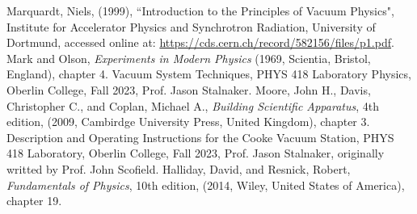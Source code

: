 \documentclass[11pt,letterpaper]{article}
\begin{document}
\begin{thebibliography}{99}
 Marquardt, Niels, (1999), ``Introduction to the Principles of Vacuum Physics", Institute for Accelerator Physics and Synchrotron Radiation, University of Dortmund, accessed online at: \url{https://cds.cern.ch/record/582156/files/p1.pdf}.
 Mark and Olson, \textit{Experiments in Modern Physics} (1969, Scientia, Bristol, England), chapter 4.
 Vacuum System Techniques, PHYS 418 Laboratory Physics, Oberlin College, Fall 2023, Prof. Jason Stalnaker.
 Moore, John H., Davis, Christopher C., and Coplan, Michael A., \textit{Building Scientific Apparatus}, 4th edition, (2009, Cambirdge University Press, United Kingdom), chapter 3.
 Description and Operating Instructions for the Cooke Vacuum Station, PHYS 418 Laboratory, Oberlin College, Fall 2023, Prof. Jason Stalnaker, originally writted by Prof. John Scofield.
 Halliday, David, and Resnick, Robert, \textit{Fundamentals of Physics}, 10th edition, (2014, Wiley, United States of America), chapter 19.

\end{thebibliography}
\end{document}
